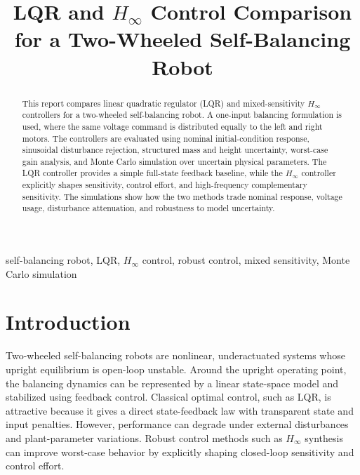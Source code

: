 \documentclass[conference]{IEEEtran}
\begin{document}
\title{LQR and $H_\infty$ Control Comparison for a Two-Wheeled Self-Balancing Robot}

\author{
}

\maketitle

\begin{abstract}
This report compares linear quadratic regulator (LQR) and mixed-sensitivity $H_\infty$ controllers for a two-wheeled self-balancing robot. A one-input balancing formulation is used, where the same voltage command is distributed equally to the left and right motors. The controllers are evaluated using nominal initial-condition response, sinusoidal disturbance rejection, structured mass and height uncertainty, worst-case gain analysis, and Monte Carlo simulation over uncertain physical parameters. The LQR controller provides a simple full-state feedback baseline, while the $H_\infty$ controller explicitly shapes sensitivity, control effort, and high-frequency complementary sensitivity. The simulations show how the two methods trade nominal response, voltage usage, disturbance attenuation, and robustness to model uncertainty.
\end{abstract}

\begin{IEEEkeywords}
self-balancing robot, LQR, $H_\infty$ control, robust control, mixed sensitivity, Monte Carlo simulation
\end{IEEEkeywords}

\section{Introduction}
Two-wheeled self-balancing robots are nonlinear, underactuated systems whose upright equilibrium is open-loop unstable. Around the upright operating point, the balancing dynamics can be represented by a linear state-space model and stabilized using feedback control. Classical optimal control, such as LQR, is attractive because it gives a direct state-feedback law with transparent state and input penalties. However, performance can degrade under external disturbances and plant-parameter variations. Robust control methods such as $H_\infty$ synthesis can improve worst-case behavior by explicitly shaping closed-loop sensitivity and control effort.
\end{document}
